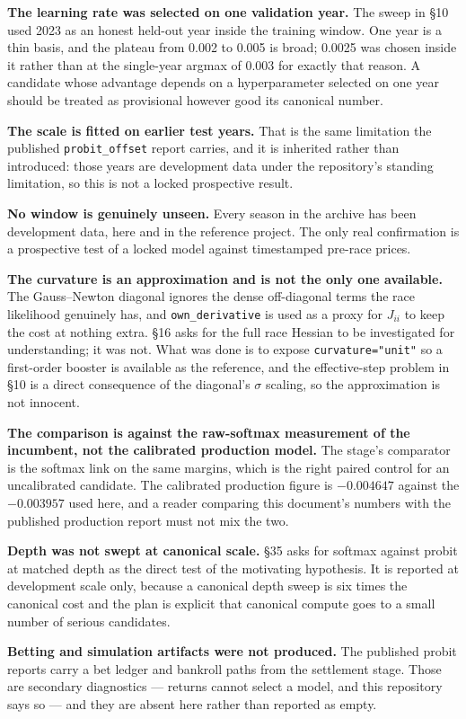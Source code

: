 \textbf{The learning rate was selected on one validation year.} The sweep in §10 used 2023 as an
honest held-out year inside the training window. One year is a thin basis, and the plateau from
0.002 to 0.005 is broad; 0.0025 was chosen inside it rather than at the single-year argmax of
0.003 for exactly that reason. A candidate whose advantage depends on a hyperparameter selected
on one year should be treated as provisional however good its canonical number.

\textbf{The scale is fitted on earlier test years.} That is the same limitation the published
\texttt{probit\_offset} report carries, and it is inherited rather than introduced: those years
are development data under the repository's standing limitation, so this is not a locked
prospective result.

\textbf{No window is genuinely unseen.} Every season in the archive has been development data,
here and in the reference project. The only real confirmation is a prospective test of a locked
model against timestamped pre-race prices.

\textbf{The curvature is an approximation and is not the only one available.} The Gauss--Newton
diagonal ignores the dense off-diagonal terms the race likelihood genuinely has, and
\texttt{own\_derivative} is used as a proxy for $J_{ii}$ to keep the cost at nothing extra. §16
asks for the full race Hessian to be investigated for understanding; it was not. What was done
is to expose \texttt{curvature="unit"} so a first-order booster is available as the reference,
and the effective-step problem in §10 is a direct consequence of the diagonal's $\sigma$
scaling, so the approximation is not innocent.

\textbf{The comparison is against the raw-softmax measurement of the incumbent, not the
calibrated production model.} The stage's comparator is the softmax link on the same margins,
which is the right paired control for an uncalibrated candidate. The calibrated production
figure is $-0.004647$ against the $-0.003957$ used here, and a reader comparing this document's
numbers with the published production report must not mix the two.

\textbf{Depth was not swept at canonical scale.} §35 asks for softmax against probit at matched
depth as the direct test of the motivating hypothesis. It is reported at development scale only,
because a canonical depth sweep is six times the canonical cost and the plan is explicit that
canonical compute goes to a small number of serious candidates.

\textbf{Betting and simulation artifacts were not produced.} The published probit reports carry
a bet ledger and bankroll paths from the settlement stage. Those are secondary diagnostics ---
returns cannot select a model, and this repository says so --- and they are absent here rather
than reported as empty.

